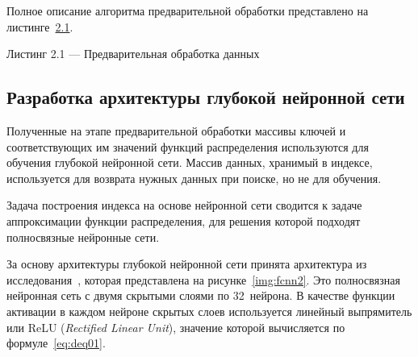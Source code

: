 Полное описание алгоритма предварительной обработки представлено на
листинге~\hyperref[alg:preprocess]{2.1}.
\pagebreak

\noindent\parbox[t]{\linewidth}{
Листинг 2.1 --- Предварительная обработка данных
}
\vspace{-1cm}
\begin{algorithm}
    \label{alg:preprocess}
    \small

\end{algorithm}

\subsection{Разработка архитектуры глубокой нейронной сети\label{dnn}}

Полученные на этапе предварительной обработки массивы ключей и соответствующих
им значений функций распределения используются для обучения глубокой нейронной
сети. Массив данных, хранимый в индексе, используется для возврата нужных
данных при поиске, но не для обучения.

Задача построения индекса на основе нейронной сети сводится к задаче
аппроксимации функции распределения, для решения которой подходят полносвязные
нейронные сети.

За основу архитектуры глубокой нейронной сети принята архитектура из
исследования~\cite{main}, которая представлена на рисунке~\ref{img:fcnn2}.  Это
полносвязная нейронная сеть с двумя скрытыми слоями по 32~нейрона.  В качестве
функции активации в каждом нейроне скрытых слоев используется линейный
выпрямитель или ReLU (\textit{Rectified Linear Unit}), значение которой
вычисляется по формуле~\eqref{eq:deq01}.


